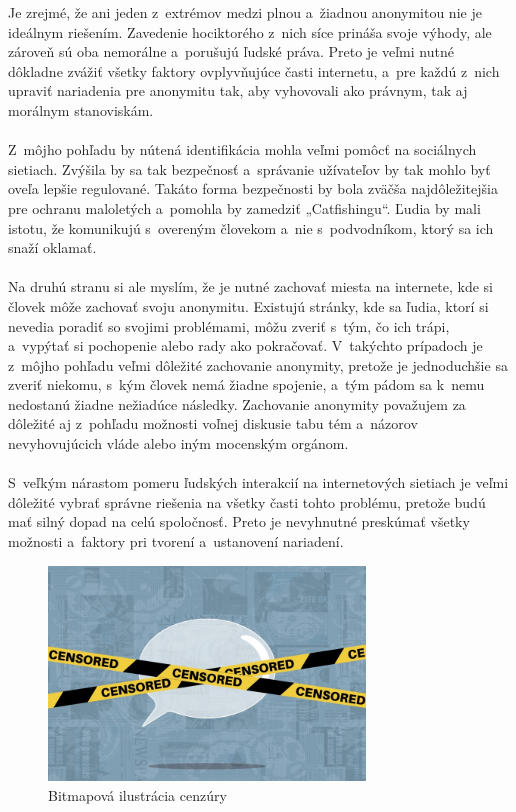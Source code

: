 \documentclass{article}
\begin{document}
Je zrejmé, že ani jeden z~extrémov  medzi plnou a~žiadnou anonymitou nie je ideálnym riešením. Zavedenie hociktorého z~nich síce prináša svoje výhody, ale zároveň sú oba nemorálne a~porušujú ľudské práva. Preto je veľmi nutné dôkladne zvážiť všetky faktory ovplyvňujúce časti internetu, a~pre každú z~nich upraviť nariadenia pre anonymitu tak, aby vyhovovali ako právnym, tak aj morálnym stanoviskám.\\\\
Z~môjho pohľadu by nútená identifikácia mohla veľmi pomôcť na sociálnych sietiach. Zvýšila by sa tak bezpečnosť a~správanie užívateľov by tak mohlo byť oveľa lepšie regulované. Takáto forma bezpečnosti by bola zväčša najdôležitejšia pre ochranu maloletých a~pomohla by zamedziť „Catfishingu“. Ľudia by mali istotu, že komunikujú s~overeným človekom  a~nie s~podvodníkom,  ktorý sa ich snaží oklamať.\\\\
Na druhú stranu si ale myslím, že je nutné zachovať miesta na internete, kde si človek môže zachovať svoju anonymitu. Existujú stránky, kde sa ľudia, ktorí si nevedia poradiť so svojimi problémami, môžu zveriť s~tým, čo ich trápi, a~vypýtať si pochopenie alebo rady ako pokračovať. V~takýchto prípadoch je z~môjho pohľadu veľmi dôležité zachovanie anonymity, pretože je jednoduchšie sa zveriť niekomu, s~kým človek nemá žiadne spojenie, a~tým pádom sa k~nemu nedostanú žiadne nežiadúce následky. Zachovanie anonymity považujem za dôležité aj z~pohľadu možnosti voľnej diskusie tabu tém a~názorov nevyhovujúcich vláde alebo iným mocenským orgánom.\\\\
S~veľkým nárastom pomeru ľudských interakcií na internetových  sietiach je veľmi dôležité vybrať správne riešenia na všetky časti tohto problému, pretože budú mať silný dopad na celú spoločnosť. Preto je nevyhnutné preskúmať všetky možnosti a~faktory pri tvorení a~ustanovení nariadení.

\begin{figure}[htbp]
    \begin{center}
        \includegraphics[width=0.75\textwidth]{censor}
    \end{center}
    \caption{Bitmapová ilustrácia cenzúry}
    \label{censor}
\end{figure}
\end{document}
